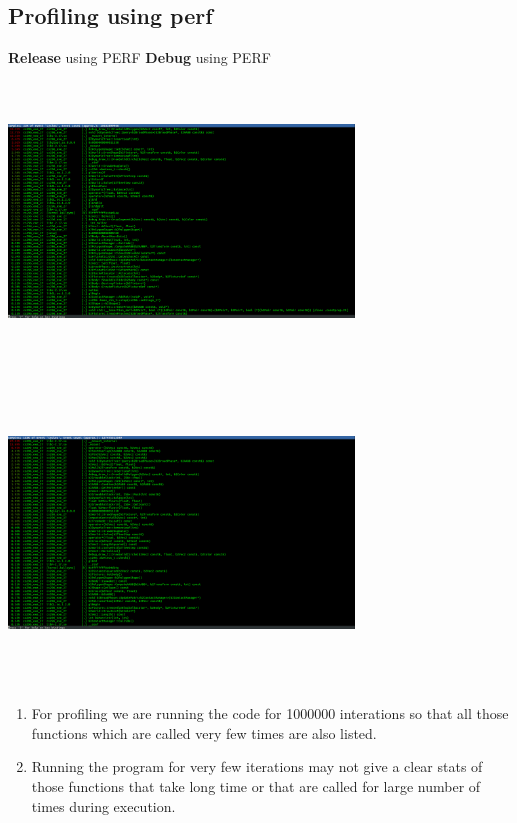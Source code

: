 \documentclass{article}
\begin{document}
\subsection{Profiling using perf}
\textbf{Release} using PERF      				\hfill	\textbf{Debug} using PERF\\
\includegraphics[width=260pt,height=230pt]{perf_release}\hfill
\includegraphics[width=260pt,height=230pt]{perf_debug}\\
\begin{enumerate}
\item For profiling we are running the code for 1000000 interations so that all those functions which are called very few times are also listed.
\item Running the program for very few iterations may not give a clear stats of those functions that take long time or that are called for large 
number of times during execution.
\end{enumerate}
\end{document}
